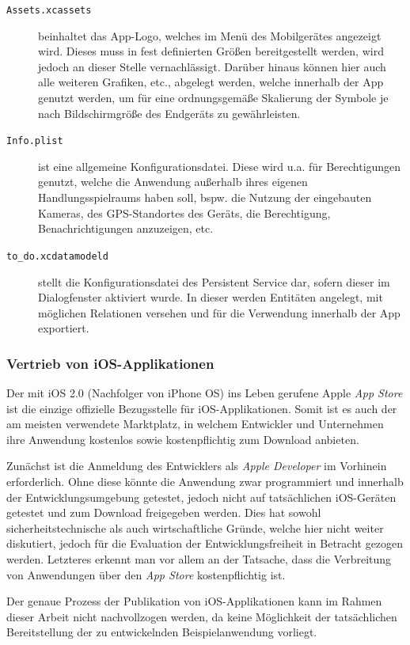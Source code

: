 \begin{description}
	\item[\texttt{Assets.xcassets}] beinhaltet das App-Logo, welches im Menü des Mobilgerätes angezeigt wird. Dieses muss in fest definierten Größen bereitgestellt werden, wird jedoch an dieser Stelle vernachlässigt. Darüber hinaus können hier auch alle weiteren Grafiken, etc., abgelegt werden, welche innerhalb der App genutzt werden, um für eine ordnungsgemäße Skalierung der Symbole je nach Bildschirmgröße des Endgeräts zu gewährleisten.
	\item[\texttt{Info.plist}] ist eine allgemeine Konfigurationsdatei. Diese wird u.a. für Berechtigungen genutzt, welche die Anwendung außerhalb ihres eigenen Handlungsspielraums haben soll, bspw. die Nutzung der eingebauten Kameras, des GPS-Standortes des Geräts, die Berechtigung, Benachrichtigungen anzuzeigen, etc.
	\item[\texttt{to\_do.xcdatamodeld}] stellt die Konfigurationsdatei des Persistent Service dar, sofern dieser im Dialogfenster aktiviert wurde. In dieser werden Entitäten angelegt, mit möglichen Relationen versehen und für die Verwendung innerhalb der App exportiert.
\end{description}

\subsubsection{Vertrieb von iOS-Applikationen}
Der mit iOS 2.0 (Nachfolger von iPhone OS) ins Leben gerufene Apple \textit{App Store} ist die einzige offizielle Bezugsstelle für iOS-Applikationen. Somit ist es auch der am meisten verwendete Marktplatz, in welchem Entwickler und Unternehmen ihre Anwendung kostenlos sowie kostenpflichtig zum Download anbieten.

Zunächst ist die Anmeldung des Entwicklers als \textit{Apple Developer} im Vorhinein erforderlich. Ohne diese könnte die Anwendung zwar programmiert und innerhalb der Entwicklungsumgebung getestet, jedoch nicht auf tatsächlichen iOS-Geräten getestet und zum Download freigegeben werden. Dies hat sowohl sicherheitstechnische als auch wirtschaftliche Gründe, welche hier nicht weiter diskutiert, jedoch für die Evaluation der Entwicklungsfreiheit in Betracht gezogen werden. Letzteres erkennt man vor allem an der Tatsache, dass die Verbreitung von Anwendungen über den \textit{App Store} kostenpflichtig ist.

Der genaue Prozess der Publikation von iOS-Applikationen kann im Rahmen dieser Arbeit nicht nachvollzogen werden, da keine Möglichkeit der tatsächlichen Bereitstellung der zu entwickelnden Beispielanwendung vorliegt.

